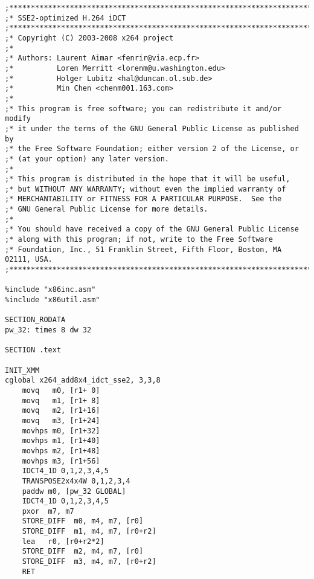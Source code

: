\begin{lstlisting}[caption = {idct8x8（SSE2实现）}, label = lst:idct8x8sse2, language = {[x86masm]Assembler}]
;************************************************************************
;* SSE2-optimized H.264 iDCT
;************************************************************************
;* Copyright (C) 2003-2008 x264 project
;*
;* Authors: Laurent Aimar <fenrir@via.ecp.fr>
;*          Loren Merritt <lorenm@u.washington.edu>
;*          Holger Lubitz <hal@duncan.ol.sub.de>
;*          Min Chen <chenm001.163.com>
;*
;* This program is free software; you can redistribute it and/or modify
;* it under the terms of the GNU General Public License as published by
;* the Free Software Foundation; either version 2 of the License, or
;* (at your option) any later version.
;*
;* This program is distributed in the hope that it will be useful,
;* but WITHOUT ANY WARRANTY; without even the implied warranty of
;* MERCHANTABILITY or FITNESS FOR A PARTICULAR PURPOSE.  See the
;* GNU General Public License for more details.
;*
;* You should have received a copy of the GNU General Public License
;* along with this program; if not, write to the Free Software
;* Foundation, Inc., 51 Franklin Street, Fifth Floor, Boston, MA  02111, USA.
;************************************************************************

%include "x86inc.asm"
%include "x86util.asm"

SECTION_RODATA
pw_32: times 8 dw 32

SECTION .text

INIT_XMM
cglobal x264_add8x4_idct_sse2, 3,3,8
    movq   m0, [r1+ 0]
    movq   m1, [r1+ 8]
    movq   m2, [r1+16]
    movq   m3, [r1+24]
    movhps m0, [r1+32]
    movhps m1, [r1+40]
    movhps m2, [r1+48]
    movhps m3, [r1+56]
    IDCT4_1D 0,1,2,3,4,5
    TRANSPOSE2x4x4W 0,1,2,3,4
    paddw m0, [pw_32 GLOBAL]
    IDCT4_1D 0,1,2,3,4,5
    pxor  m7, m7
    STORE_DIFF  m0, m4, m7, [r0]
    STORE_DIFF  m1, m4, m7, [r0+r2]
    lea   r0, [r0+r2*2]
    STORE_DIFF  m2, m4, m7, [r0]
    STORE_DIFF  m3, m4, m7, [r0+r2]
    RET
\end{lstlisting}